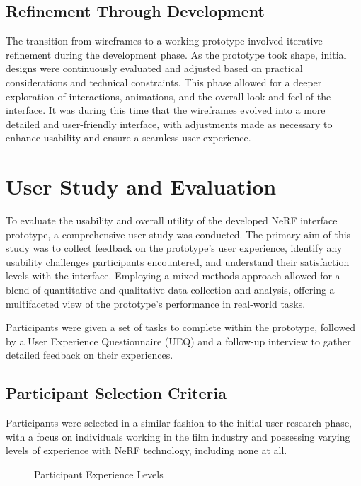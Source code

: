\subsection*{Refinement Through Development}

The transition from wireframes to a working prototype involved iterative refinement during the development phase. 
As the prototype took shape, initial designs were continuously evaluated and adjusted based on practical considerations and technical constraints. 
This phase allowed for a deeper exploration of interactions, animations, and the overall look and feel of the interface. 
It was during this time that the wireframes evolved into a more detailed and user-friendly interface, with adjustments made as necessary to enhance usability and ensure a seamless user experience.

\section{User Study and Evaluation}
\label{sec:methodology:study}

To evaluate the usability and overall utility of the developed NeRF interface prototype, a comprehensive user study was conducted. 
The primary aim of this study was to collect feedback on the prototype's user experience, identify any usability challenges participants encountered, and understand their satisfaction levels with the interface. 
Employing a mixed-methods approach allowed for a blend of quantitative and qualitative data collection and analysis, offering a multifaceted view of the prototype's performance in real-world tasks.

Participants were given a set of tasks to complete within the prototype, followed by a User Experience Questionnaire (UEQ) and a follow-up interview to gather detailed feedback on their experiences.

\subsection*{Participant Selection Criteria}
\label{sec:methodology:study:criteria}

Participants were selected in a similar fashion to the initial user research phase, with a focus on individuals working in the film industry and possessing varying levels of experience with NeRF technology, including none at all.

\begin{figure}[htb]
  \centering
  \caption{Participant Experience Levels}
  \label{fig:study:experience}  
\end{figure}


